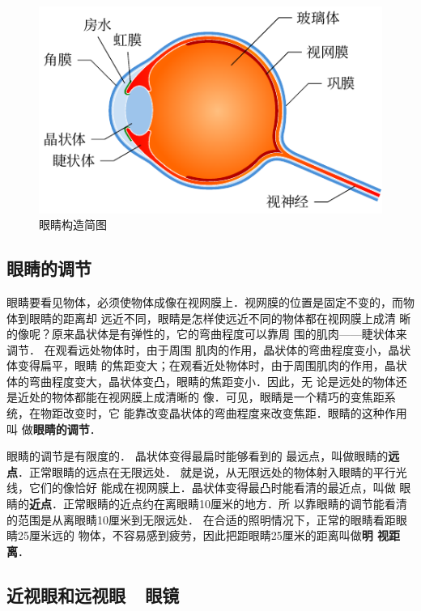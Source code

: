 \begin{figure}[htbp]
	\centering
	\includegraphics{fig/C/5-49.pdf}
	\caption{眼睛构造简图}\label{fig_C_5-49}
\end{figure}


\subsection{眼睛的调节}

眼睛要看见物体，必须使物体成像在视网膜上．视网膜的位置是固定不变的，而物体到眼睛的距离却
远近不同，眼睛是怎样使远近不同的物体都在视网膜上成清
晰的像呢？原来晶状体是有弹性的，它的弯曲程度可以靠周
围的肌肉——睫状体来调节．
在观看远处物体时，由于周围
肌肉的作用，晶状体的弯曲程度变小，晶状体变得扁平，眼睛
的焦距变大；在观看近处物体时，由于周围肌肉的作用，晶状
体的弯曲程度变大，晶状体变凸，眼睛的焦距变小．因此，无
论是远处的物体还是近处的物体都能在视网膜上成清晰的
像．可见，眼睛是一个精巧的变焦距系统，在物距改变时，它
能靠改变晶状体的弯曲程度来改变焦距．眼睛的这种作用叫
做\textbf{眼睛的调节}．

眼睛的调节是有限度的．
晶状体变得最扁时能够看到的
最远点，叫做眼睛的\textbf{远点}．正常眼睛的远点在无限远处．
就是说，从无限远处的物体射入眼睛的平行光线，它们的像恰好
能成在视网膜上．晶状体变得最凸时能看清的最近点，叫做
眼睛的\textbf{近点}．正常眼睛的近点约在离眼睛10厘米的地方．所
以靠眼睛的调节能看清的范围是从离眼睛10厘米到无限远处．
在合适的照明情况下，正常的眼睛看距眼睛25厘米远的
物体，不容易感到疲劳，因此把距眼睛25厘米的距离叫做\textbf{明
视距离}．

\subsection{近视眼和远视眼~~眼镜}

